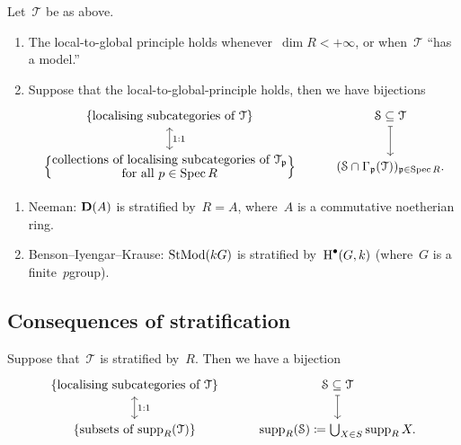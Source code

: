 \documentclass[10pt,a4paper]{article}
\begin{document}
\begin{proposition}
  Let~$\mathcal{T}$ be as above.
  \begin{enumerate}
    \item The local-to-global principle holds whenever~$\dim R<+\infty$, or when~$\mathcal{T}$ ``has a model.''
    \item Suppose that the local-to-global-principle holds, then we have bijections
      \begin{equation}
        \begin{tikzcd}
          \left\{ \text{localising subcategories of $\mathcal{T}$} \right\} \arrow[leftrightarrow]{d}{1:1} & \mathcal{S}\subseteq\mathcal{T} \arrow[mapsto]{d} \\
          \left\{ \substack{\displaystyle\text{collections of localising subcategories of~$\mathcal{T}_{\mathfrak{p}}$} \\ \displaystyle\text{for all $p\in\Spec R$}} \right\} & (\mathcal{S}\cap\Gamma_{\mathfrak{p}}(\mathcal{T}))_{\mathfrak{p}\in\Spec R}.
        \end{tikzcd}
      \end{equation}
  \end{enumerate}
\end{proposition}

\begin{example}
  \begin{enumerate}
    \item Neeman: $\mathbf{D}(A)$ is stratified by~$R=A$, where~$A$ is a commutative noetherian ring.
    \item Benson--Iyengar--Krause: $\operatorname{StMod}(kG)$ is stratified by~$\operatorname{H}^\bullet(G,k)$ (where~$G$ is a finite~$p$\dash group).
  \end{enumerate}
\end{example}

\subsection{Consequences of stratification}
\begin{theorem}
  Suppose that~$\mathcal{T}$ is stratified by~$R$. Then we have a bijection
  \begin{equation}
    \begin{tikzcd}
      \left\{ \text{localising subcategories of~$\mathcal{T}$} \right\} \arrow[leftrightarrow]{d}{1:1} & \mathcal{S}\subseteq\mathcal{T} \arrow[mapsto]{d} \\
      \left\{ \text{subsets of $\supp_R(\mathcal{T})$} \right\} & \supp_R(\mathcal{S})\coloneqq\bigcup_{X\in S}\supp_R X.
    \end{tikzcd}
  \end{equation}
\end{theorem}
\end{document}
